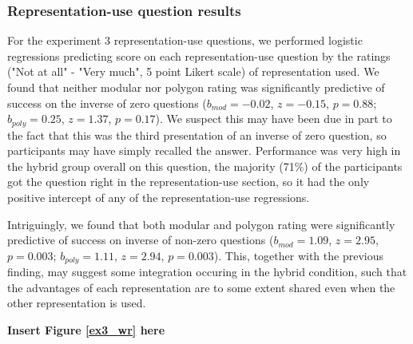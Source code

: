 \documentclass[man,10pt]{apa6}
\begin{document}
\subsubsection{Representation-use question results}
For the experiment 3 representation-use questions, we performed logistic regressions predicting score on each representation-use question by the ratings ("Not at all" - "Very much", 5 point Likert scale) of representation used. We found that neither modular nor polygon rating was significantly predictive of success on the inverse of zero questions ($b_{mod} = -0.02$, $z = -0.15$, $p = 0.88$; $b_{poly} = 0.25$, $z = 1.37$, $p = 0.17$). We suspect this may have been due in part to the fact that this was the third presentation of an inverse of zero question, so participants may have simply recalled the answer. Performance was very high in the hybrid group overall on this question, the majority (71\%) of the participants got the question right in the representation-use section, so it had the only positive intercept of any of the representation-use regressions.\par 
Intriguingly, we found that both modular and polygon rating were significantly predictive of success on inverse of non-zero questions ($b_{mod} = 1.09$, $z = 2.95$, $p = 0.003$; $b_{poly} = 1.11$, $z = 2.94$, $p = 0.003$). This, together with the previous finding, may suggest some integration occuring in the hybrid condition, such that the advantages of each representation are to some extent shared even when the other representation is used. 
\begin{center} 
{\bf Insert Figure \ref{ex3_wr} here} 
\end{center}
\end{document}
